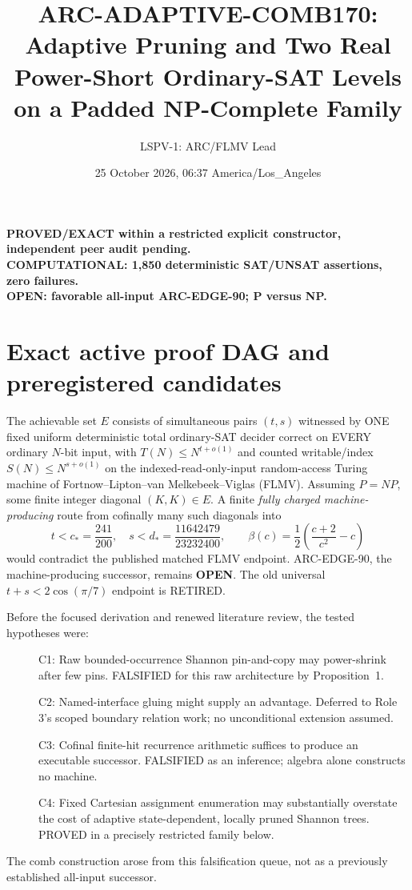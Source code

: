 \documentclass[11pt]{article}
\title{ARC-ADAPTIVE-COMB170: Adaptive Pruning and Two Real Power-Short Ordinary-SAT Levels on a Padded NP-Complete Family}
\author{LSPV-1: ARC/FLMV Lead}
\date{25 October 2026, 06:37 America/Los\_Angeles}
\newcommand{\OPEN}{\textbf{OPEN}}
\begin{document}
\maketitle
\begin{center}
\textbf{PROVED/EXACT within a restricted explicit constructor, independent peer audit pending.}\\
\textbf{COMPUTATIONAL: 1,850 deterministic SAT/UNSAT assertions, zero failures.}\\
\textbf{OPEN: favorable all-input ARC-EDGE-90; P versus NP.}
\end{center}

\section{Exact active proof DAG and preregistered candidates}
The achievable set $E$ consists of simultaneous pairs $(t,s)$ witnessed by ONE fixed uniform deterministic total ordinary-SAT decider correct on EVERY ordinary $N$-bit input, with $T(N)\le N^{t+o(1)}$ and counted writable/index $S(N)\le N^{s+o(1)}$ on the indexed-read-only-input random-access Turing machine of Fortnow--Lipton--van Melkebeek--Viglas (FLMV). Assuming $P=NP$, some finite integer diagonal $(K,K)\in E$. A finite \emph{fully charged machine-producing} route from cofinally many such diagonals into
\[
t<c_*=\frac{241}{200},\quad s<d_*=\frac{11642479}{23232400},
\qquad \beta(c)=\frac12\left(\frac{c+2}{c^2}-c\right)
\]
would contradict the published matched FLMV endpoint. ARC-EDGE-90, the machine-producing successor, remains \OPEN. The old universal $t+s<2\cos(\pi/7)$ endpoint is RETIRED.

Before the focused derivation and renewed literature review, the tested hypotheses were:
\begin{description}
\item[] C1: Raw bounded-occurrence Shannon pin-and-copy may power-shrink after few pins. FALSIFIED for this raw architecture by Proposition~1.
\item[] C2: Named-interface gluing might supply an advantage. Deferred to Role 3's scoped boundary relation work; no unconditional extension assumed.
\item[] C3: Cofinal finite-hit recurrence arithmetic suffices to produce an executable successor. FALSIFIED as an inference; algebra alone constructs no machine.
\item[] C4: Fixed Cartesian assignment enumeration may substantially overstate the cost of adaptive state-dependent, locally pruned Shannon trees. PROVED in a precisely restricted family below.
\end{description}
The comb construction arose from this falsification queue, not as a previously established all-input successor.
\end{document}
